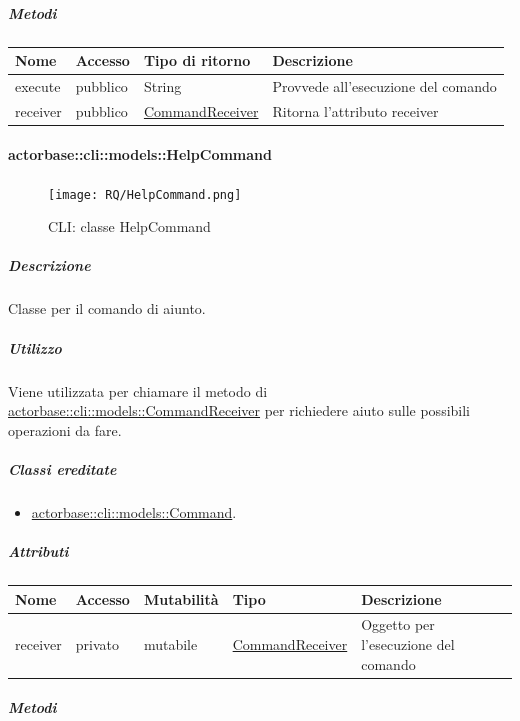 \documentclass{scalatekids-article}
\begin{document}
\subparagraph{Metodi}

\begin{tabular}{| l | l | l | l |}
  \hline
  Nome & Accesso & Tipo di ritorno & Descrizione\\
  \hline
  execute & pubblico & String & Provvede all'esecuzione del comando\\
  \hline
  receiver & pubblico & \hyperref[sec:actorbase::cli::models::CommandReceiver]{CommandReceiver} & Ritorna l'attributo receiver\\
  \hline
\end{tabular}


\paragraph{actorbase::cli::models::HelpCommand}
\label{sec:actorbase::cli::models::HelpCommand}

\begin{figure}[H]
  \begin{center}
    \texttt{[image: RQ/HelpCommand.png]}
    \caption{CLI: classe HelpCommand}
  \end{center}
\end{figure}

\subparagraph{Descrizione}

Classe per il comando di aiunto.

\subparagraph{Utilizzo}
Viene utilizzata per chiamare il metodo di
\hyperref[sec:actorbase::cli::models::CommandReceiver]{actorbase::cli::models::CommandReceiver} per richiedere aiuto sulle possibili operazioni da fare.

\subparagraph{Classi ereditate}
\begin{itemize}
\item \hyperref[sec:actorbase::cli::models::Command]{actorbase::cli::models::Command}.
\end{itemize}

\subparagraph{Attributi}

\begin{tabular}{| p{1cm} | p{1.5cm} | p{2cm} | p{4cm} | p{8.5cm} |}
  \hline
  Nome & Accesso & Mutabilità & Tipo & Descrizione\\
  \hline
  receiver & privato & mutabile & \hyperref[sec:actorbase::cli::models::CommandReceiver]{CommandReceiver} & Oggetto per l'esecuzione del comando \\
  \hline
\end{tabular}

\subparagraph{Metodi}
\end{document}

